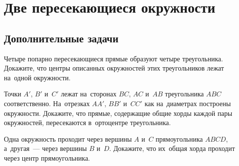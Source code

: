 
\section*{Две пересекающиеся окружности}

\subsection*{Дополнительные задачи}




\begin{problems}

\item
Четыре попарно пересекающиеся прямые образуют четыре треугольника.
Докажите, что центры описанных окружностей этих треугольников лежат на~одной
окружности.

\item
Точки $A'$, $B'$ и~$C'$ лежат на~сторонах $BC$, $AC$ и~$AB$ треугольника $ABC$
соответственно.
На~отрезках $AA'$, $BB'$ и~$CC'$ как на~диаметрах построены окружности.
Докажите, что прямые, содержащие общие хорды каждой пары окружностей,
пересекаются в~ортоцентре треугольника.

\item
Одна окружность проходит через вершины $A$ и~$C$ прямоугольника $ABCD$,
а~другая~--- через вершины $B$ и~$D$.
Докажите, что их~общая хорда проходит через центр прямоугольника.

\end{problems}

